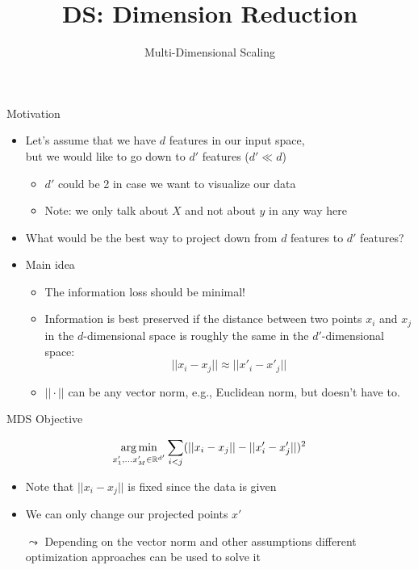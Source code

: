 \documentclass[aspectratio=169]{../latex_main/tntbeamer}  %
\title[Statistics]{DS: Dimension Reduction}
\subtitle{Multi-Dimensional Scaling}
\begin{document}
	
	\maketitle
	
    \begin{frame}[c]{Motivation}
        
        \begin{itemize}
            \item Let's assume that we have $d$ features in our input space,\\ but we would like to go down to $d'$ features ($d' \ll d$)
            \begin{itemize}
                \item $d'$ could be 2 in case we want to visualize our data
                \item Note: we only talk about $X$ and not about $y$ in any way here
            \end{itemize}
            \medskip
            \item What would be the best way to project down from $d$ features to $d'$ features?
            \item Main idea
            \begin{itemize}
                \item The information loss should be minimal!
                \item Information is best preserved if the distance between two points $x_i$ and $x_j$ in the $d$-dimensional space is roughly the same in the $d'$-dimensional space:
                $$ ||x_i - x_j || \approx || x'_i - x'_j || $$
                \item $||\cdot||$ can be any vector norm, e.g., Euclidean norm, but doesn't have to.
            \end{itemize}
        \end{itemize}

	\end{frame}
	
	\begin{frame}[c]{MDS Objective}
        
         $$\operatorname*{arg\,min}_{x'_1, \ldots x'_M \in \mathbb{R}^{d'}} \sum_{i< j}  (||x_i - x_j || - || x'_i - x'_j ||)^2$$
        
        \begin{itemize}
            
            \item Note that $||x_i - x_j ||$ is fixed since the data is given
            \item We can only change our projected points $x'$
            \item[$\leadsto$] Depending on the vector norm and other assumptions different optimization approaches can be used to solve it
        \end{itemize}
        
	\end{frame}
	
\end{document}
